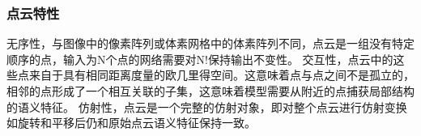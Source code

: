 \begin{frame}
\frametitle{点云特性}
无序性，与图像中的像素阵列或体素网格中的体素阵列不同，点云是一组没有特定顺序的点，输入为N个点的网络需要对N!保持输出不变性。
交互性，点云中的这些点来自于具有相同距离度量的欧几里得空间。这意味着点与点之间不是孤立的，相邻的点形成了一个相互关联的子集，这意味着模型需要从附近的点捕获局部结构的语义特征。
仿射性，点云是一个完整的仿射对象，即对整个点云进行仿射变换如旋转和平移后仍和原始点云语义特征保持一致。
    
\end{frame}